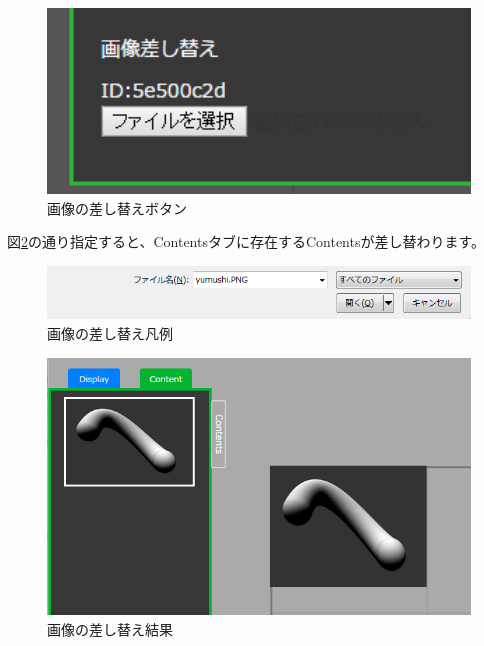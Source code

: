 \documentclass[a4paper,10pt,oneside]{jsbook}
\begin{document}
\begin{figure}[htbp]
	\begin{center}
		\includegraphics[width=11.5cm]{image/SASHI.PNG}
	\end{center}
	\caption{画像の差し替えボタン}
	\label{fig:replaceimagebutton}
\end{figure}

図\ref{fig:replaceimage}の通り指定すると、Contentsタブに存在するContentsが差し替わります。\\

\begin{figure}[htbp]
	\begin{center}
		\includegraphics[width=11.5cm]{image/YUMUSHI.PNG}
	\end{center}
	\caption{画像の差し替え凡例}
	\label{fig:replaceimage}
\end{figure}


\begin{figure}[htbp]
	\begin{center}
		\includegraphics[width=11.5cm]{image/SASHI2.PNG}
	\end{center}
	\caption{画像の差し替え結果}
	\label{fig:replaceimageresult}
\end{figure}
\end{document}
